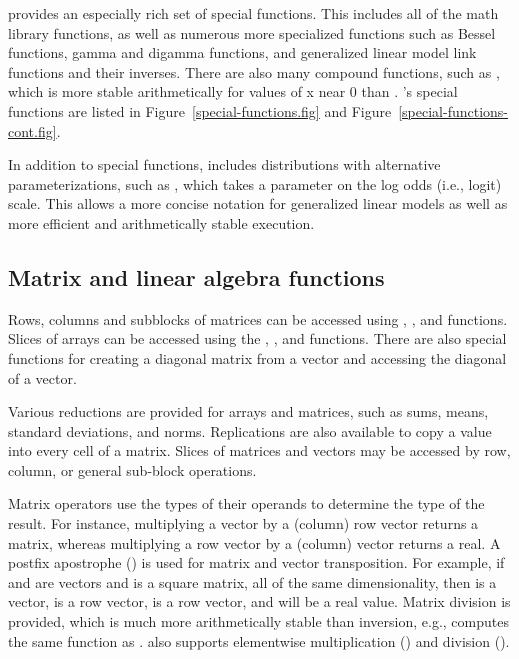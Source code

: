 \documentclass[article]{jss}
\begin{document}
 provides an especially rich set of special functions.
This includes all of the  math library functions, as
well as numerous more specialized functions such as Bessel functions,
gamma and digamma functions, and generalized linear model link
functions and their inverses.  There are also many compound functions,
such as , which is more stable arithmetically for
values of x near 0 than .  's special
functions are listed in Figure~\ref{special-functions.fig} and
Figure~\ref{special-functions-cont.fig}.  

In addition to special functions,  includes distributions with
alternative parameterizations, such as , which
takes a parameter on the log odds (i.e., logit) scale.  This allows a
more concise notation for generalized linear models as well as more
efficient and arithmetically stable execution.  


\subsection{Matrix and linear algebra functions}

Rows, columns and subblocks of matrices can be accessed using
, , and  functions.  Slices of arrays
can be accessed using the , , and 
functions.  There are also special functions for creating a diagonal
matrix from a vector and accessing the diagonal of a vector.

Various reductions are provided for arrays and matrices, such as sums,
means, standard deviations, and norms.  Replications are also available
to copy a value into every cell of a matrix.  Slices of matrices and
vectors may be accessed by row, column, or general sub-block
operations.

Matrix operators use the types of their operands to determine the type
of the result.  For instance, multiplying a vector by a (column) row
vector returns a matrix, whereas multiplying a row vector by a
(column) vector returns a real.  A postfix apostrophe () is
used for matrix and vector transposition.  For example, if 
and  are vectors and  is a square matrix, all of
the same dimensionality, then  is a vector,
 is a row vector,  is a row
vector, and  will be a real value.
Matrix division is provided, which is much more arithmetically stable
than inversion, e.g.,  computes the same
function as .   also
supports elementwise multiplication () and division
().
\end{document}
